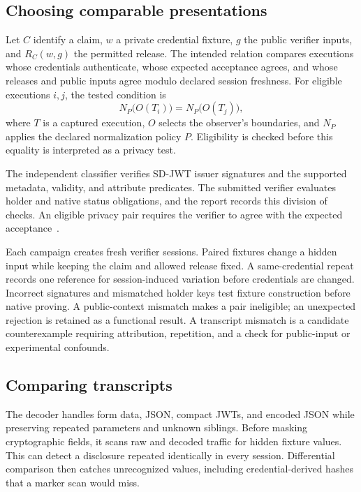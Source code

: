\documentclass[10pt,twocolumn,letterpaper]{article}
\begin{document}
\subsection{Choosing comparable presentations}
Let $C$ identify a claim, $w$ a private credential fixture, $g$ the public verifier inputs, and $R_C(w,g)$ the permitted release. The intended relation compares executions whose credentials authenticate, whose expected acceptance agrees, and whose releases and public inputs agree modulo declared session freshness. For eligible executions $i,j$, the tested condition is
\begin{equation}
 N_P\bigl(O(T_i)\bigr)=N_P\bigl(O(T_j)\bigr),
\label{eq:relation}
\end{equation}
where $T$ is a captured execution, $O$ selects the observer's boundaries, and $N_P$ applies the declared normalization policy $P$. Eligibility is checked before this equality is interpreted as a privacy test.

The independent classifier verifies SD-JWT issuer signatures and the supported metadata, validity, and attribute predicates. The submitted verifier evaluates holder and native status obligations, and the report records this division of checks. An eligible privacy pair requires the verifier to agree with the expected acceptance~\cite{artifact}.

Each campaign creates fresh verifier sessions. Paired fixtures change a hidden input while keeping the claim and allowed release fixed. A same-credential repeat records one reference for session-induced variation before credentials are changed. Incorrect signatures and mismatched holder keys test fixture construction before native proving. A public-context mismatch makes a pair ineligible; an unexpected rejection is retained as a functional result. A transcript mismatch is a candidate counterexample requiring attribution, repetition, and a check for public-input or experimental confounds.

\subsection{Comparing transcripts}
The decoder handles form data, JSON, compact JWTs, and encoded JSON while preserving repeated parameters and unknown siblings. Before masking cryptographic fields, it scans raw and decoded traffic for hidden fixture values. This can detect a disclosure repeated identically in every session. Differential comparison then catches unrecognized values, including credential-derived hashes that a marker scan would miss.
\end{document}
